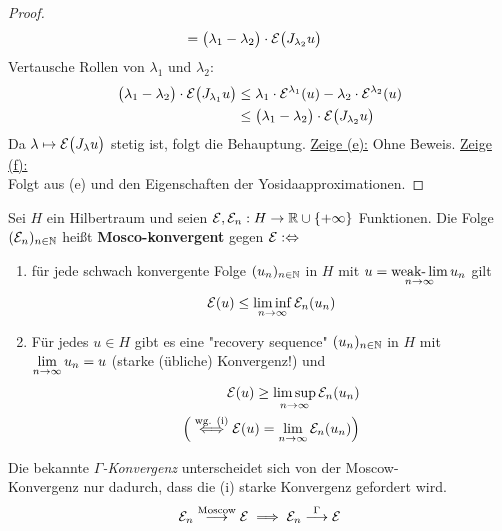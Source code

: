 \begin{proof}
\begin{align*}
		&=\big(\lambda_1-\lambda_2\big)\cdot\mathcal{E}\big(J_{\lambda_2}u\big)
	\end{align*}
	Vertausche Rollen von $\lambda_1$ und $\lambda_2$:
	\begin{align*}
		\big(\lambda_1-\lambda_2\big)\cdot\mathcal{E}\big(J_{\lambda_1} u\big)
		&\leq \lambda_1\cdot\mathcal{E}^{\lambda_1}(u)-\lambda_2\cdot\mathcal{E}^{\lambda_2}(u)\\
		&\leq\big(\lambda_1-\lambda_2\big)\cdot\mathcal{E}\big(J_{\lambda_2}u\big)
	\end{align*}
	Da $\lambda\mapsto\mathcal{E}\big(J_{\lambda} u\big)$ stetig ist, folgt die Behauptung.\nl
	\underline{Zeige (e):} Ohne Beweis.\nl
	\underline{Zeige (f):}\\
	Folgt aus (e) und den Eigenschaften der Yosidaapproximationen.
\end{proof}

\begin{definition}
	Sei $H$ ein Hilbertraum und seien $\mathcal{E},\mathcal{E}_n:H\to\mathbb{R}\cup\lbrace+\infty\rbrace$ Funktionen.
	Die Folge $(\mathcal{E}_n)_{n\in\mathbb{N}}$ heißt \textbf{Mosco-konvergent} gegen $\mathcal{E}:\Leftrightarrow$
	\begin{enumerate}[label=(\roman*)]
		\item für jede schwach konvergente Folge $(u_n)_{n\in\mathbb{N}}$ in $H$ mit $u=\operatorname*{\text{weak-}\lim}\limits_{n\to\infty} u_n$ gilt
		\begin{align*}
			\mathcal{E}(u)\leq\liminf\limits_{n\to\infty}\mathcal{E}_n(u_n)
		\end{align*}
		\item Für jedes $u\in H$ gibt es eine "recovery sequence" $(u_n)_{n\in\mathbb{N}}$ in $H$ mit $\lim\limits_{n\to\infty} u_n=u$ 
		(starke (übliche) Konvergenz!) und 
		\begin{align*}
			\mathcal{E}(u)\geq\limsup\limits_{n\to\infty}\mathcal{E}_n(u_n)\\
			\Big(\overset{\text{wg. (i)}}{\Longleftrightarrow}
			\mathcal{E}(u)=\lim\limits_{n\to\infty}\mathcal{E}_n(u_n)\Big)
		\end{align*}
	\end{enumerate}
\end{definition}

\begin{bemerkung}
	Die bekannte \textit{$\Gamma$-Konvergenz} unterscheidet sich von der Moscow-\\Konvergenz nur dadurch, dass die (i) starke Konvergenz gefordert wird.
	\begin{align*}
		\mathcal{E}_n\overset{\text{Moscow}}{\longrightarrow}\mathcal{E}\implies\mathcal{E}_n\overset{\Gamma}{\longrightarrow}\mathcal{E}
	\end{align*}
\end{bemerkung}


